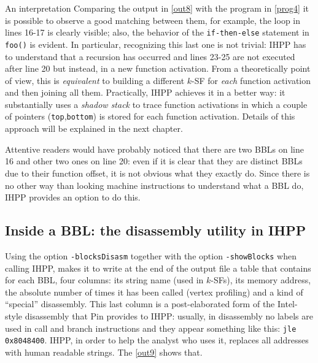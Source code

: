 \documentclass[a4paper,10pt]{report}
\begin{document}
\begin{paragraph}{An interpretation}
Comparing the output in \cref{out8} with the program in \cref{prog4} it is possible to 
observe a good matching between them, for example, the loop in lines 16-17 
is clearly visible; also, the behavior of the \verb|if-then-else| statement in \verb|foo()| is evident. In particular, recognizing this last one is not trivial: 
IHPP has to understand that a recursion has occurred and lines 23-25
are not executed after line 20 but instead, in a new function activation. 
From a theoretically point of view, 
this is \emph{equivalent} to building a different $k$-SF
for \emph{each} function activation and then joining all them. 
Practically, IHPP achieves it in a better way: 
it substantially uses a \emph{shadow stack} to trace function activations in which
a couple of pointers (\verb|top|,\verb|bottom|) is stored for each 
function activation. Details of this approach will be explained in the next chapter.
\end{paragraph}

Attentive readers would have probably noticed that there are two BBLs on line 16 
and other two ones on line 20: even if it is clear that they are distinct 
BBLs due to their function offset, it is not obvious what they exactly do.
Since there is no other way than looking machine instructions to understand 
what a BBL do, IHPP provides an option to do this.

\subsection{Inside a BBL: the disassembly utility in IHPP}

Using the option \verb|-blocksDisasm| together with the option \verb|-showBlocks| 
when calling IHPP, makes it to write at the end of the output file a table 
that contains for each BBL, four columns: its string name (used in $k$-SFs), its memory address, the absolute number of times it has been called (vertex profiling) and
a kind of ``special'' disassembly. This last column is a post-elaborated form 
of the Intel-style disassembly that Pin provides to IHPP: usually, in disassembly 
no labels are used in call and branch instructions and they appear something like this: 
\verb|jle 0x8048400|. IHPP, in order to help the analyst who uses it, replaces 
all addresses with human readable strings. The \cref{out9} shows that.
\end{document}
